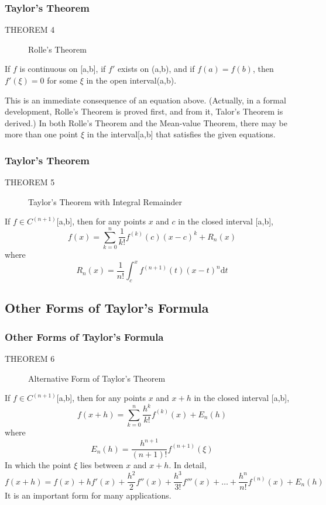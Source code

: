 \documentclass[notheorems,mathserif,table,compress]{beamer}  %
\begin{document}
\begin{frame}
  \frametitle{Taylor's Theorem}
\begin{description}
\item[THEOREM 4] \textsf{Rolle's Theorem}
\end{description}
If $f$ is continuous on [a,b], if $f'$ exists on  (a,b), and if $f(a)=f(b)$, then $f'(\xi)=0$ for some $\xi$ in the open interval(a,b).
\newline

This is an immediate consequence of an equation above. (Actually, in a formal development, Rolle's Theorem is proved first, and from it, Talor's Theorem is derived.) In both Rolle's Theorem and the Mean-value Theorem, there may be more than one point $\xi$ in the interval[a,b] that satisfies the given equations.
\end{frame}

\begin{frame}
  \frametitle{Taylor's Theorem}
\begin{description}
\item[THEOREM 5] \textsf{Taylor's Theorem with Integral Remainder}
\end{description}
If $f \in C^{(n+1)}$[a,b], then for any points $x$ and $c$ in the closed interval [a,b],
\begin{displaymath}
f(x)=\sum_{k=0}^n \frac{1}{k!}f^{(k)}(c)(x-c)^k +R_n(x)
\end{displaymath}
where 
\newcommand{\ud}{\mathrm{d}}
\begin{displaymath}
R_n(x)=\frac{1}{n!}\int_{c}^{x} f^{(n+1)}(t)(x-t)^n \ud t
\end{displaymath}
\end{frame}

\subsection{Other Forms of Taylor's Formula}
\begin{frame}
  \frametitle{Other Forms of Taylor's Formula}
\begin{description}
\item[THEOREM 6] \textsf{Alternative Form of Taylor's Theorem}
\end{description}
If $f \in C^{(n+1)}$[a,b], then for any points $x$ and $x+h$ in the closed interval [a,b],
\begin{displaymath}
f(x+h)=\sum_{k=0}^n \frac{h^k}{k!}f^{(k)}(x) +E_n(h)
\end{displaymath}
where 
\begin{displaymath}
E_n(h)=\frac{h^{n+1}}{(n+1)!} f^{(n+1)}(\xi)
\end{displaymath}
In which the point $\xi$ lies between $x$ and $x+h$. In detail,
\begin{displaymath}
f(x+h)=f(x)+hf'(x)+\frac{h^2}{2}f''(x)+\frac{h^3}{3!}f'''(x)+\ldots+\frac{h^n}{n!}f^{(n)}(x)+E_n(h)
\end{displaymath}
It is an important form for many applications.
\end{frame}
\end{document}
